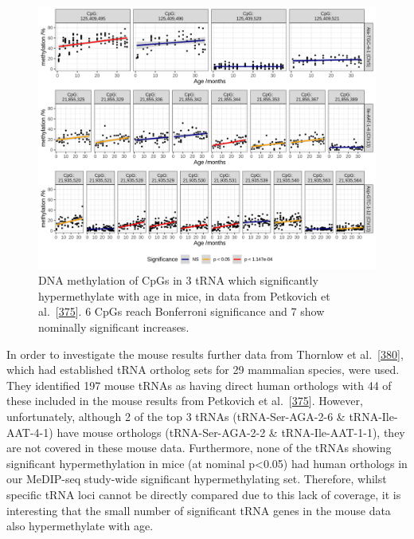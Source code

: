 \documentclass[
]{book}
\begin{document}
\begin{figure}

{\centering \includegraphics[width=1\linewidth]{./figs/CpGPlotComb} 

}

\caption{DNA methylation of CpGs in 3 tRNA which significantly hypermethylate with age in mice, in data from Petkovich et al.~{[}\protect\hyperlink{ref-Petkovich2017}{375}{]}. 6 CpGs reach Bonferroni significance and 7 show nominally significant increases.}\label{fig:mouse}
\end{figure}



In order to investigate the mouse results further data from Thornlow et al.~{[}\protect\hyperlink{ref-Thornlow2020}{380}{]}, which had established tRNA ortholog sets for 29 mammalian species, were used.
They identified 197 mouse tRNAs as having direct human orthologs with 44 of these included in the mouse results from Petkovich et al.~{[}\protect\hyperlink{ref-Petkovich2017}{375}{]}.
However, unfortunately, although 2 of the top 3 tRNAs (tRNA-Ser-AGA-2-6 \& tRNA-Ile-AAT-4-1) have mouse orthologs (tRNA-Ser-AGA-2-2 \& tRNA-Ile-AAT-1-1), they are not covered in these mouse data.
Furthermore, none of the tRNAs showing significant hypermethylation in mice (at nominal p\textless0.05) had human orthologs in our MeDIP-seq study-wide significant hypermethylating set.
Therefore, whilst specific tRNA loci cannot be directly compared due to this lack of coverage, it is interesting that the small number of significant tRNA genes in the mouse data also hypermethylate with age.
\end{document}
